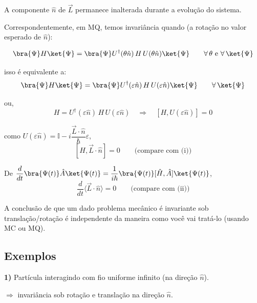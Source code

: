 A componente $\hat{n}$ de $\vec{L}$ permanece inalterada durante a evolução do sistema.

Correspondentemente, em MQ, temos invariância quando (a rotação no valor esperado de $\hat{n}$):

\begin{equation}
    \bra{\Psi} H \ket{\Psi} = \bra{\Psi} U^{\dagger}(\theta\hat{n})\, H\, U(\theta\hat{n}) \ket{\Psi} \qquad \forall\,\theta\ \text{e}\ \forall\,\ket{\Psi}
\label{eq:aula21_invar_mq_1}
\end{equation}

isso é equivalente a:
\begin{equation}
    \bra{\Psi} H \ket{\Psi} = \bra{\Psi} U^{\dagger}(\varepsilon\hat{n})\, H\, U(\varepsilon\hat{n}) \ket{\Psi} \qquad \forall\,\ket{\Psi}
\label{eq:aula21_invar_mq_2}
\end{equation}

ou,
\begin{equation}
    H = U^{\dagger}(\varepsilon\hat{n})\, H\, U(\varepsilon\hat{n}) \quad \Longrightarrow \quad [H, U(\varepsilon\hat{n})] = 0
\label{eq:aula21_invar_mq_3}
\end{equation}

como $U(\varepsilon\hat{n}) = \mathbb{I} - i\dfrac{\vec{L}\cdot\hat{n}}{\hbar}\varepsilon$,
\begin{equation}
    \boxed{[H, \vec{L}\cdot\hat{n}] = 0} \qquad \text{(compare com (i))}
\label{eq:aula21_invar_mq_comutador}
\end{equation}

De $\dfrac{d}{dt}\bra{\Psi(t)} \hat{A} \ket{\Psi(t)} = \dfrac{1}{i\hbar}\bra{\Psi(t)} [\hat{H},\hat{A}] \ket{\Psi(t)}$,
\begin{equation}
    \boxed{\frac{d}{dt}\langle \vec{L}\cdot\hat{n} \rangle = 0} \qquad \text{(compare com (ii))}
\label{eq:aula21_invar_mq_consequencia}
\end{equation}

A conclusão de que um dado problema mecânico é invariante sob translação/rotação é independente da maneira como você vai tratá-lo (usando MC ou MQ).

\subsection*{Exemplos}

\textbf{1)} Partícula interagindo com fio uniforme infinito (na direção $\hat{n}$).
\begin{center}
\end{center}
$\Rightarrow$ invariância sob rotação e translação na direção $\hat{n}$.

